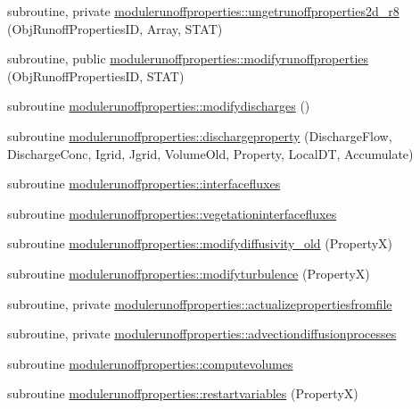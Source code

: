 \begin{DoxyCompactItemize}
\item 
subroutine, private \mbox{\hyperlink{namespacemodulerunoffproperties_abb57930bec871aba1885b2ccb5a1eaee}{modulerunoffproperties\+::ungetrunoffproperties2d\+\_\+r8}} (Obj\+Runoff\+Properties\+ID, Array, S\+T\+AT)
\item 
subroutine, public \mbox{\hyperlink{namespacemodulerunoffproperties_a3d6f36b2dc50b19f17e60e0778172343}{modulerunoffproperties\+::modifyrunoffproperties}} (Obj\+Runoff\+Properties\+ID, S\+T\+AT)
\item 
subroutine \mbox{\hyperlink{namespacemodulerunoffproperties_a2c08e63707bcb52fb1de5d2a76a15433}{modulerunoffproperties\+::modifydischarges}} ()
\item 
subroutine \mbox{\hyperlink{namespacemodulerunoffproperties_a0c6359324c15a7b6b781861fed41ffb8}{modulerunoffproperties\+::dischargeproperty}} (Discharge\+Flow, Discharge\+Conc, Igrid, Jgrid, Volume\+Old, Property, Local\+DT, Accumulate)
\item 
subroutine \mbox{\hyperlink{namespacemodulerunoffproperties_a076e539417a822f7177b60e8449345e3}{modulerunoffproperties\+::interfacefluxes}}
\item 
subroutine \mbox{\hyperlink{namespacemodulerunoffproperties_ab3ab37be90febb6cff96da7ee7284955}{modulerunoffproperties\+::vegetationinterfacefluxes}}
\item 
subroutine \mbox{\hyperlink{namespacemodulerunoffproperties_ae867bca73f793abb9a8fe22800ea546c}{modulerunoffproperties\+::modifydiffusivity\+\_\+old}} (PropertyX)
\item 
subroutine \mbox{\hyperlink{namespacemodulerunoffproperties_a8f78696440cd79402c857e4191fd185e}{modulerunoffproperties\+::modifyturbulence}} (PropertyX)
\item 
subroutine, private \mbox{\hyperlink{namespacemodulerunoffproperties_a6cb9ce64b26164eb148aae403b3e9ab0}{modulerunoffproperties\+::actualizepropertiesfromfile}}
\item 
subroutine, private \mbox{\hyperlink{namespacemodulerunoffproperties_ae6b8378908b26858152e5bb2b1132217}{modulerunoffproperties\+::advectiondiffusionprocesses}}
\item 
subroutine \mbox{\hyperlink{namespacemodulerunoffproperties_aebcfa403a8c7338421febfe72507ff1e}{modulerunoffproperties\+::computevolumes}}
\item 
subroutine \mbox{\hyperlink{namespacemodulerunoffproperties_a0582858e9347f67d92588e44257918a3}{modulerunoffproperties\+::restartvariables}} (PropertyX)
\item 

\end{DoxyCompactItemize}
